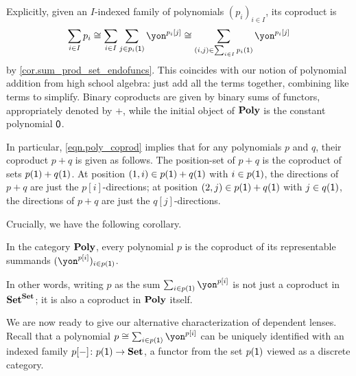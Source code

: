 \documentclass[Book-Poly]{subfiles}
\begin{document}
Explicitly, given an $I$-indexed family of polynomials $(p_i)_{i \in I}$, its coproduct is
\begin{equation} \label{eqn.poly_coprod}\index{coproduct!of indexed family}
  \sum_{i \in I} p_i \iso \sum_{i \in I} \sum_{j \in p_i(\1)} \yon^{p_i[j]} \iso \sum_{(i,j) \in \sum_{i \in I} p_i(\1)} \yon^{p_i[j]}
\end{equation}
by \cref{cor.sum_prod_set_endofuncs}.
This coincides with our notion of polynomial addition from high school algebra: just add all the terms together, combining like terms to simplify.
Binary coproducts are given by binary sums of functors, appropriately denoted by $+$, while the initial object of $\mathbf{Poly}$ is the constant polynomial $\textsf{0}$.

In particular, \eqref{eqn.poly_coprod} implies that for any polynomials $p$ and $q$, their coproduct $p+q$ is given as follows.
The position-set of $p+q$ is the coproduct of sets $p(\textsf{1}) + q(\textsf{1})$.
At position $(1,i) \in p(\textsf{1}) + q(\textsf{1})$ with $i \in p(\textsf{1})$, the directions of $p+q$ are just the $p[i]$-directions; at position $(2,j) \in p(\textsf{1}) + q(\textsf{1})$ with $j \in q(\textsf{1})$, the directions of $p+q$ are just the $q[j]$-directions.

Crucially, we have the following corollary.

\begin{corollary} \label{cor.poly-coprod-repr}
  In the category $\mathbf{Poly}$, every polynomial $p$ is the coproduct of its representable summands $(\yon^{p[i]})_{i\in p(\1)}$.
\end{corollary}

In other words, writing $p$ as the sum $\sum_{i\in p(\1)}\yon^{p[i]}$ is not just a coproduct in $\mathbf{Set}^{\mathbf{Set}}$; it is also a coproduct in $\mathbf{Poly}$ itself.

We are now ready to give our alternative characterization of dependent lenses.
Recall that a polynomial $p\iso\sum_{i\in p(\1)}\yon^{p[i]}$ can be uniquely identified with an indexed family $p[-]\colon p(\textsf{1})\to\mathbf{Set}$, a functor from the set $p(\textsf{1})$ viewed as a discrete category.
\end{document}
